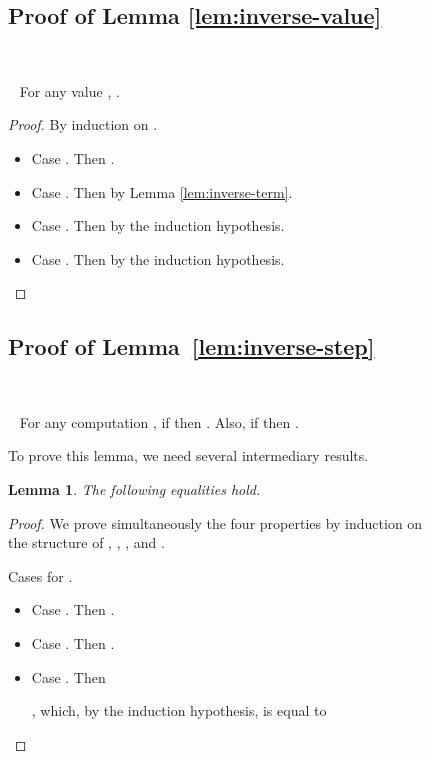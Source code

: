 \documentclass{LMCS}
\newtheorem{lemma}[theorem]{Lemma}
\newcommand{\recap}[2]{\medskip\noindent{\bf #1 \ref{#2}.}~}
\begin{document}
\begin{figure}
{\subsection{Proof of Lemma \ref{lem:inverse-value}}\label{proof:inverse-value}~

\recap{Lemma}{lem:inverse-value} For any value , .
\begin{proof}
  By induction on .
  \begin{itemize}
    \item Case . Then .
    \item Case . Then 
      by Lemma \ref{lem:inverse-term}. 
    \item Case . Then 
      by the induction hypothesis.
    \item Case . Then 
      by the induction hypothesis.
      \qedhere
  \end{itemize}
\end{proof}

\subsection{Proof of Lemma~\ref{lem:inverse-step}}\label{proof:inverse-step}~

\recap{Lemma}{lem:inverse-step} For any computation , if 
then . Also, if 
then .

\bigskip
To prove this lemma, we need several intermediary results.

\begin{lemma}\label{lem:substitution-lemma}
  The following equalities hold.
  \begin{myenumerate}
    \item 
    \item 
    \item 
    \item 
  \end{myenumerate}
\end{lemma}
\begin{proof}
  We prove simultaneously the four properties by induction on the structure of , , , and .
  \begin{myenumerate}
    \item Cases for .
      \begin{itemize}
	\item Case . Then .
	\item Case . Then .
	\item Case . Then 
	  
	  ,
	  which, by the induction hypothesis, is equal to
	  

\end{itemize}
\end{myenumerate}
\end{proof}}
\end{figure}
\end{document}
